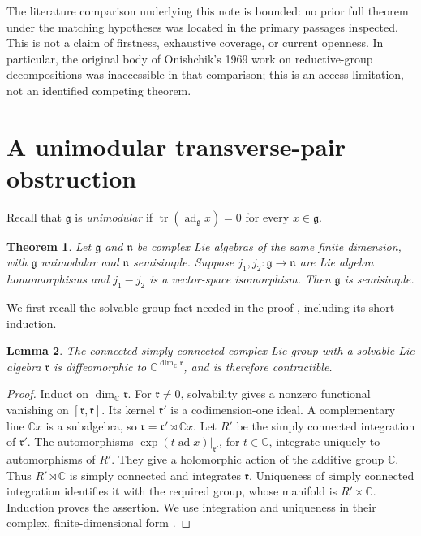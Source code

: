 \documentclass[11pt]{amsart}
\newtheorem{theorem}{Theorem}
\newtheorem{lemma}[theorem]{Lemma}
\theoremstyle{remark}
\newcommand{\g}{\mathfrak g}
\newcommand{\n}{\mathfrak n}
\newcommand{\rad}{\mathfrak r}
\newcommand{\C}{\mathbb C}
\DeclareMathOperator{\ad}{ad}
\DeclareMathOperator{\tr}{tr}
\begin{document}
The literature comparison underlying this note is bounded: no prior
full theorem under the matching hypotheses was located in the primary
passages inspected.  This is not a claim of firstness, exhaustive
coverage, or current openness.  In particular, the original body of
Onishchik's 1969 work on reductive-group decompositions was inaccessible
in that comparison; this is an access limitation, not an identified
competing theorem.

\section{A unimodular transverse-pair obstruction}

Recall that \(\g\) is \emph{unimodular} if
\(\tr(\ad_{\g}x)=0\) for every \(x\in\g\).

\begin{theorem}\label{thm:pair}
Let \(\g\) and \(\n\) be complex Lie algebras of the same finite
dimension, with \(\g\) unimodular and \(\n\) semisimple.
Suppose \(j_1,j_2:\g\to\n\) are Lie algebra homomorphisms and
\(j_1-j_2\) is a vector-space isomorphism.  Then \(\g\) is semisimple.
\end{theorem}

We first recall the solvable-group fact needed in the proof
\cite[Theorem~49.1]{Etingof}, including its short induction.

\begin{lemma}\label{lem:solvable}
The connected simply connected complex Lie group with a solvable
Lie algebra \(\rad\) is diffeomorphic to
\(\C^{\dim_{\C}\rad}\), and is therefore contractible.
\end{lemma}

\begin{proof}
Induct on \(\dim_{\C}\rad\).  For \(\rad\ne0\), solvability gives a
nonzero functional vanishing on \([\rad,\rad]\).  Its kernel
\(\rad'\) is a codimension-one ideal.  A complementary line \(\C x\)
is a subalgebra, so \(\rad=\rad'\rtimes\C x\).
Let \(R'\) be the simply connected integration of \(\rad'\).
The automorphisms \(\exp(t\ad x)|_{\rad'}\), for \(t\in\C\),
integrate uniquely to automorphisms of \(R'\).  They give a
holomorphic action of the additive group \(\C\).
Thus \(R'\rtimes\C\) is simply connected and integrates \(\rad\).
Uniqueness of simply connected integration identifies it with the
required group, whose manifold is \(R'\times\C\).
Induction proves the assertion.  We use integration and uniqueness in
their complex, finite-dimensional form
\cite[Theorems~9.12--9.13 and Corollary~9.14]{Etingof}.
\end{proof}
\end{document}
